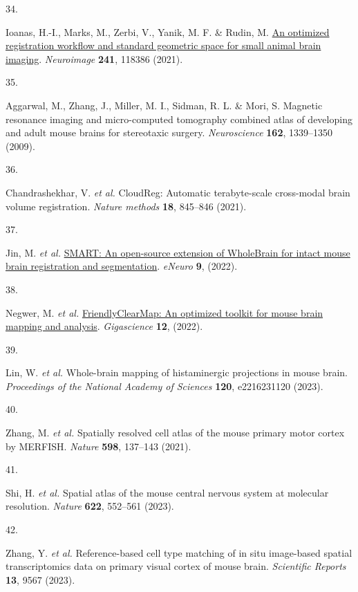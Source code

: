 \documentclass[
  12pt,
]{article}
\newlength{\cslhangindent}
\newlength{\csllabelwidth}
\newenvironment{CSLReferences}[2] %
 {\begin{list}{}{%
  \setlength{\itemindent}{0pt}
  \setlength{\leftmargin}{0pt}
  \setlength{\parsep}{0pt}
  \ifodd #1
   \setlength{\leftmargin}{\cslhangindent}
   \setlength{\itemindent}{-1\cslhangindent}
  \fi
  \setlength{\itemsep}{#2\baselineskip}}}
 {\end{list}}
\newcommand{\CSLLeftMargin}[1]{\parbox[t]{\csllabelwidth}{\strut#1\strut}}
\newcommand{\CSLRightInline}[1]{\parbox[t]{\linewidth - \csllabelwidth}{\strut#1\strut}}
\begin{document}
\begin{CSLReferences}{0}{0}
\CSLLeftMargin{34. }%
\CSLRightInline{Ioanas, H.-I., Marks, M., Zerbi, V., Yanik, M. F. \&
Rudin, M. \href{https://doi.org/10.1016/j.neuroimage.2021.118386}{An
optimized registration workflow and standard geometric space for small
animal brain imaging}. \emph{Neuroimage} \textbf{241}, 118386 (2021).}

\CSLLeftMargin{35. }%
\CSLRightInline{Aggarwal, M., Zhang, J., Miller, M. I., Sidman, R. L. \&
Mori, S. Magnetic resonance imaging and micro-computed tomography
combined atlas of developing and adult mouse brains for stereotaxic
surgery. \emph{Neuroscience} \textbf{162}, 1339--1350 (2009).}

\CSLLeftMargin{36. }%
\CSLRightInline{Chandrashekhar, V. \emph{et al.} CloudReg: Automatic
terabyte-scale cross-modal brain volume registration. \emph{Nature
methods} \textbf{18}, 845--846 (2021).}

\CSLLeftMargin{37. }%
\CSLRightInline{Jin, M. \emph{et al.}
\href{https://doi.org/10.1523/ENEURO.0482-21.2022}{SMART: An open-source
extension of WholeBrain for intact mouse brain registration and
segmentation}. \emph{eNeuro} \textbf{9}, (2022).}

\CSLLeftMargin{38. }%
\CSLRightInline{Negwer, M. \emph{et al.}
\href{https://doi.org/10.1093/gigascience/giad035}{FriendlyClearMap: An
optimized toolkit for mouse brain mapping and analysis}.
\emph{Gigascience} \textbf{12}, (2022).}

\CSLLeftMargin{39. }%
\CSLRightInline{Lin, W. \emph{et al.} Whole-brain mapping of
histaminergic projections in mouse brain. \emph{Proceedings of the
National Academy of Sciences} \textbf{120}, e2216231120 (2023).}

\CSLLeftMargin{40. }%
\CSLRightInline{Zhang, M. \emph{et al.} Spatially resolved cell atlas of
the mouse primary motor cortex by MERFISH. \emph{Nature} \textbf{598},
137--143 (2021).}

\CSLLeftMargin{41. }%
\CSLRightInline{Shi, H. \emph{et al.} Spatial atlas of the mouse central
nervous system at molecular resolution. \emph{Nature} \textbf{622},
552--561 (2023).}

\CSLLeftMargin{42. }%
\CSLRightInline{Zhang, Y. \emph{et al.} Reference-based cell type
matching of in situ image-based spatial transcriptomics data on primary
visual cortex of mouse brain. \emph{Scientific Reports} \textbf{13},
9567 (2023).}


\end{CSLReferences}
\end{document}
